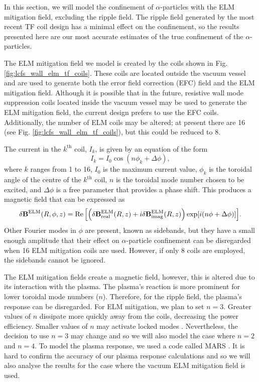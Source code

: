 \documentclass[10pt, a4paper, twoside]{article}
\begin{document}
In this section, we will model the confinement of $\alpha$-particles with the ELM mitigation field, excluding the ripple field. The ripple field generated by the most recent TF coil design has a minimal effect on the confinement, so the results presented here are our most accurate estimates of the true confinement of the $\alpha$-particles.

The ELM mitigation field we model is created by the coils shown in Fig. \ref{fig:lcfs_wall_elm_tf_coils}. These coils are located outside the vacuum vessel and are used to generate both the error field correction (EFC) field and the ELM mitigation field. Although it is possible that in the future, resistive wall mode suppression coils located inside the vacuum vessel may be used to generate the ELM mitigation field, the current design prefers to use the EFC coils. Additionally, the number of ELM coils may be altered; at present there are 16 (see Fig. \ref{fig:lcfs_wall_elm_tf_coils}), but this could be reduced to 8.

The current in the $k^\text{th}$ coil, $I_k$, is given by an equation of the form
\begin{equation}
    \label{eq:ELM_coilcurrent_profile}
    I_k = I_0 \cos(n \phi_k + \Delta \phi),
\end{equation}
where $k$ ranges from 1 to 16, $I_0$ is the maximum current value, $\phi_k$ is the toroidal angle of the centre of the $k^\text{th}$ coil, $n$ is the toroidal mode number chosen to be excited, and $\Delta \phi$ is a free parameter that provides a phase shift. This produces a magnetic field that can be expressed as
\begin{equation}
    \delta\textbf{B}^\text{ELM}(R, \phi, z)=\Re\qty[\qty(\delta\textbf{B}^\text{ELM}_\text{real}(R,z) + i\delta\textbf{B}^\text{ELM}_\text{imag}(R,z))\exp[i(n\phi + \Delta \phi)]].
\end{equation}
Other Fourier modes in $\phi$ are present, known as sidebands, but they have a small enough amplitude that their effect on $\alpha$-particle confinement can be disregarded when 16 ELM mitigation coils are used. However, if only 8 coils are employed, the sidebands cannot be ignored.

The ELM mitigation fields create a magnetic field, however, this is altered due to its interaction with the plasma. The plasma's reaction is more prominent for lower toroidal mode numbers ($n$). Therefore, for the ripple field, the plasma's response can be disregarded. For ELM mitigation, we plan to set $n=3$. Greater values of $n$ dissipate more quickly away from the coils, decreasing the power efficiency. Smaller values of $n$ may activate locked modes \cite{ryan2022}. Nevertheless, the decision to use $n=3$ may change and so we will also model the case where $n=2$ and $n=4$. To model the plasma response, we used a code called MARS \cite{liu2015}. It is hard to confirm the accuracy of our plasma response calculations and so we will also analyse the results for the case where the vacuum ELM mitigation field is used.
\end{document}
